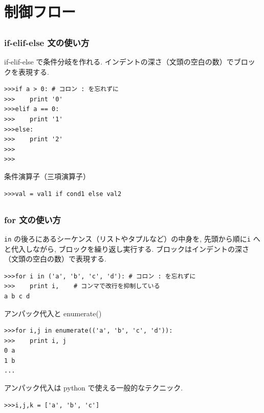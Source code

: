 \section{制御フロー}

\subsection*{\redm\whitem\greenb}
\begin{frame}[t,fragile]
\frametitle{if-elif-else 文の使い方}
if-elif-else で条件分岐を作れる.
インデントの深さ（文頭の空白の数）でブロックを表現する.
\begin{lstlisting}[stepnumber=1]
>>>if a > 0: # コロン : を忘れずに
>>>    print '0'
>>>elif a == 0:
>>>    print '1'
>>>else:
>>>    print '2'
>>>
>>>
\end{lstlisting}

条件演算子（三項演算子）

\begin{lstlisting}
>>>val = val1 if cond1 else val2
\end{lstlisting}
\end{frame}

\subsection*{\redm\whiteb\greenb}
\begin{frame}[t,fragile]
\frametitle{for 文の使い方}
\verb|in| の後ろにあるシーケンス（リストやタプルなど）の中身を, 先頭から順に\verb|i| へと代入しながら, ブロックを繰り返し実行する.
ブロックはインデントの深さ（文頭の空白の数）で表現する.
\begin{lstlisting}
>>>for i in ('a', 'b', 'c', 'd'): # コロン : を忘れずに
>>>    print i,    # コンマで改行を抑制している
a b c d
\end{lstlisting}

アンパック代入と enumerate()
\begin{lstlisting}
>>>for i,j in enumerate(('a', 'b', 'c', 'd')):
>>>    print i, j
0 a
1 b
...
\end{lstlisting}
アンパック代入は python で使える一般的なテクニック. 
\begin{lstlisting}
>>>i,j,k = ['a', 'b', 'c']
\end{lstlisting}
\end{frame}

